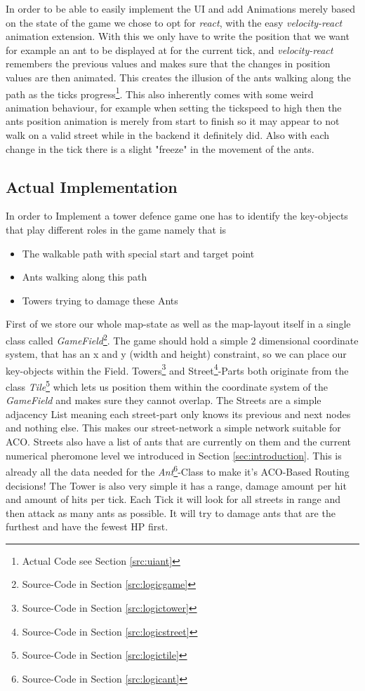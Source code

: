 In order to be able to easily implement the UI and add Animations merely based on the state of the game we chose to opt for \textit{react}\cite{libsreact}, with the easy \textit{velocity-react}\cite{libsreactvelocity} animation extension. With this we only have to write the position that we want for example an ant to be displayed at for the current tick, and \textit{velocity-react} remembers the previous values and makes sure that the changes in position values are then animated. This creates the illusion of the ants walking along the path as the ticks progress\footnote{Actual Code see Section \ref{src:uiant}}. This also inherently comes with some weird animation behaviour, for example when setting the tickspeed to high then the ants position animation is merely from start to finish so it may appear to not walk on a valid street while in the backend it definitely did. Also with each change in the tick there is a slight "freeze" in the movement of the ants.

\subsection{Actual Implementation}
\label{sec:implementationactual}

In order to Implement a tower defence game one has to identify the key-objects that play different roles in the game namely that is
\begin{itemize}
\item The walkable path with special start and target point
\item Ants walking along this path
\item Towers trying to damage these Ants
\end{itemize}
First of we store our whole map-state as well as the map-layout itself in a single class called \textit{GameField}\footnote{Source-Code in Section \ref{src:logicgame}}. The game should hold a simple 2 dimensional coordinate system, that has an x and y (width and height) constraint, so we can place our key-objects within the Field. Towers\footnote{Source-Code in Section \ref{src:logictower}} and Street\footnote{Source-Code in Section \ref{src:logicstreet}}-Parts both originate from the class \textit{Tile}\footnote{Source-Code in Section \ref{src:logictile}} which lets us position them within the coordinate system of the \textit{GameField} and makes sure they cannot overlap.
The Streets are a simple adjacency List meaning each street-part only knows its previous and next nodes and nothing else. This makes our street-network a simple network suitable for ACO. Streets also have a list of ants that are currently on them and the current numerical pheromone level we introduced in Section \ref{sec:introduction}. This is already all the data needed for the \textit{Ant}\footnote{Source-Code in Section \ref{src:logicant}}-Class to make it's ACO-Based Routing decisions!
The Tower is also very simple it has a range, damage amount per hit and amount of hits per tick. Each Tick it will look for all streets in range and then attack as many ants as possible. It will try to damage ants that are the furthest and have the fewest HP first.

